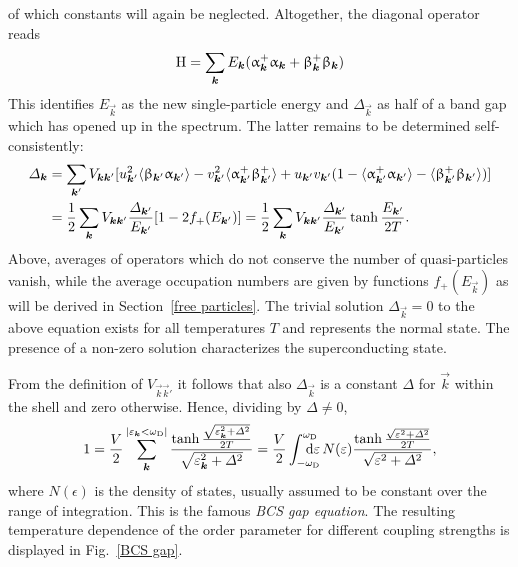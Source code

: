 %
of which constants will again be neglected. Altogether, the diagonal
 operator reads
%
\begin{equation*}
    \mathrm H =
    \sum_{\boldsymbol k} E_{\boldsymbol k}
        ( \upalpha_{\boldsymbol k}^+ \upalpha_{\boldsymbol k}
        + \upbeta_{\boldsymbol k}^+ \upbeta_{\boldsymbol k} )
\end{equation*}
%
This identifies $E_{\vec k}$ as the new single-particle energy and $\Delta_{\vec
k}$ as half of a band gap which has opened up in the spectrum. The latter
remains to be determined self-consistently:
%
\begin{align*}
    \varDelta_{\boldsymbol k} &= \sum_{\boldsymbol k'} V_{\boldsymbol k \boldsymbol k'} [
        u_{\boldsymbol k'}^2 \langle\upbeta_{\boldsymbol k'} \upalpha_{\boldsymbol k'}\rangle
        - v_{\boldsymbol k'}^2 \langle\upalpha_{\boldsymbol k'}^+ \upbeta_{\boldsymbol k'}^+\rangle
        + u_{\boldsymbol k'} v_{\boldsymbol k'} (
            1 - \langle\upalpha_{\boldsymbol k'}^+ \upalpha_{\boldsymbol k'}\rangle
            - \langle\upbeta_{\boldsymbol k'}^+ \upbeta_{\boldsymbol k'}\rangle
            )
        ]
    \\
    &= \frac 1 2 \sum_{\boldsymbol k} V_{\boldsymbol k \boldsymbol k'}
    \frac{\varDelta_{\boldsymbol k'}}{E_{\boldsymbol k'}} [1 - 2 f_+(E_{\boldsymbol k'})]
    = \frac 1 2 \sum_{\boldsymbol k} V_{\boldsymbol k \boldsymbol k'}
    \frac{\varDelta_{\boldsymbol k'}}{E_{\boldsymbol k'}} \tanh \frac{E_{\boldsymbol k'}}{2 T}.
\end{align*}
%
Above, averages of operators which do not conserve the number of
 quasi-particles vanish, while the average occupation numbers
are given by  functions $f_+(E_{\vec k})$ as will be derived in
Section~\ref{free particles}. The trivial solution $\Delta_{\vec k} = 0$ to the
above equation exists for all temperatures $T$ and represents the normal state.
The presence of a non-zero solution characterizes the superconducting state.

From the definition of $V_{\vec k \vec k'}$ it follows that also $\Delta_{\vec
k}$ is a constant $\Delta$ for $\vec k$ within the  shell and zero
otherwise. Hence, dividing by $\Delta \neq 0$,
%
\begin{equation*}
    1 = \frac V 2
    \sum_{\vec k}^{|\epsilon_{\vec k} < \omega \sub D|}
    \frac
        {\tanh \frac{\sqrt{\epsilon_{\vec k}^2 + \Delta^2}}{2 T}}
        {\sqrt{\epsilon_{\vec k}^2 + \Delta^2}}
    = \frac V 2 \int \from{-\omega \sub D} \till{\omega \sub D} \D \epsilon \,
    N(\epsilon) \frac
        {\tanh \frac{\sqrt{\epsilon^2 + \Delta^2}}{2 T}}
        {\sqrt{\epsilon^2 + \Delta^2}},
\end{equation*}
%
where $N(\epsilon)$ is the density of states, usually assumed to be constant
over the range of integration. This is the famous \emph{BCS gap equation}. The
resulting temperature dependence of the order parameter for different coupling
strengths is displayed in Fig.~\ref{BCS gap}.
